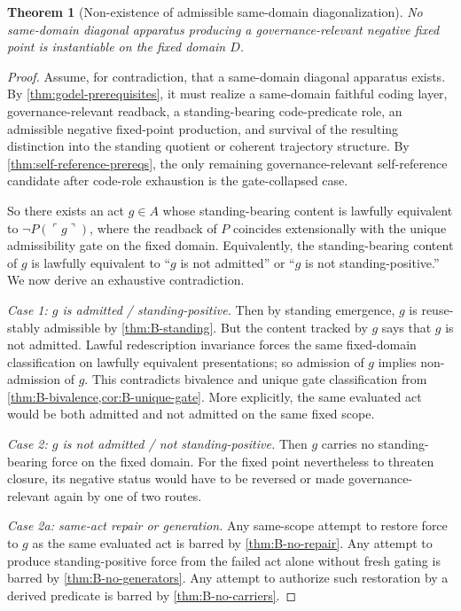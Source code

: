 \documentclass[11pt]{article}
\theoremstyle{plain}
\newtheorem{theorem}{Theorem}[section]
\theoremstyle{definition}
\newcommand{\code}[1]{\ulcorner #1 \urcorner}
\newcommand{\domain}{D}
\begin{document}
\begin{theorem}[Non-existence of admissible same-domain diagonalization]
\label{thm:no-diagonalization}
No same-domain diagonal apparatus producing a governance-relevant negative fixed point is instantiable on the fixed domain $\domain$.
\end{theorem}

\begin{proof}
Assume, for contradiction, that a same-domain diagonal apparatus exists. By \cref{thm:godel-prerequisites}, it must realize a same-domain faithful coding layer, governance-relevant readback, a standing-bearing code-predicate role, an admissible negative fixed-point production, and survival of the resulting distinction into the standing quotient or coherent trajectory structure. By \cref{thm:self-reference-prereqs}, the only remaining governance-relevant self-reference candidate after code-role exhaustion is the gate-collapsed case.

So there exists an act $g\in A$ whose standing-bearing content is lawfully equivalent to $\neg P(\code{g})$, where the readback of $P$ coincides extensionally with the unique admissibility gate on the fixed domain. Equivalently, the standing-bearing content of $g$ is lawfully equivalent to ``$g$ is not admitted'' or ``$g$ is not standing-positive.'' We now derive an exhaustive contradiction.

\emph{Case 1: $g$ is admitted / standing-positive.} Then by standing emergence, $g$ is reuse-stably admissible by \cref{thm:B-standing}. But the content tracked by $g$ says that $g$ is not admitted. Lawful redescription invariance forces the same fixed-domain classification on lawfully equivalent presentations; so admission of $g$ implies non-admission of $g$. This contradicts bivalence and unique gate classification from \cref{thm:B-bivalence,cor:B-unique-gate}. More explicitly, the same evaluated act would be both admitted and not admitted on the same fixed scope.

\emph{Case 2: $g$ is not admitted / not standing-positive.} Then $g$ carries no standing-bearing force on the fixed domain. For the fixed point nevertheless to threaten closure, its negative status would have to be reversed or made governance-relevant again by one of two routes.

\emph{Case 2a: same-act repair or generation.} Any same-scope attempt to restore force to $g$ as the same evaluated act is barred by \cref{thm:B-no-repair}. Any attempt to produce standing-positive force from the failed act alone without fresh gating is barred by \cref{thm:B-no-generators}. Any attempt to authorize such restoration by a derived predicate is barred by \cref{thm:B-no-carriers}.


\end{proof}
\end{document}
